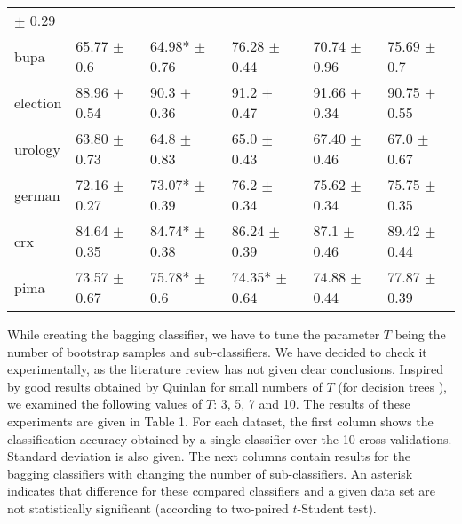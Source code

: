 \documentclass{llncs}
\begin{document}
\begin{table}
{\begin{tabular}{llllll}
\scriptsize{$\pm$ 0.29} \\ bupa & 65.77 \scriptsize{$\pm$ 0.6} & 64.98*
\scriptsize{$\pm$ 0.76} & 76.28 \scriptsize{$\pm$ 0.44} & 70.74
\scriptsize{$\pm$ 0.96} & 75.69 \scriptsize{$\pm$ 0.7} \\ election & 88.96
\scriptsize{$\pm$ 0.54} & 90.3 \scriptsize{$\pm$ 0.36} & 91.2
\scriptsize{$\pm$ 0.47} & 91.66 \scriptsize{$\pm$ 0.34} & 90.75
\scriptsize{$\pm$ 0.55} \\  urology & 63.80 \scriptsize{$\pm$ 0.73} & 64.8
\scriptsize{$\pm$ 0.83} & 65.0 \scriptsize{$\pm$ 0.43} & 67.40
\scriptsize{$\pm$ 0.46} & 67.0 \scriptsize{$\pm$ 0.67} \\ german & 72.16
\scriptsize{$\pm$ 0.27} & 73.07* \scriptsize{$\pm$ 0.39} & 76.2
\scriptsize{$\pm$ 0.34} & 75.62 \scriptsize{$\pm$ 0.34} & 75.75
\scriptsize{$\pm$ 0.35} \\ crx & 84.64 \scriptsize{$\pm$ 0.35} & 84.74*
\scriptsize{$\pm$ 0.38} & 86.24 \scriptsize{$\pm$ 0.39} & 87.1
\scriptsize{$\pm$ 0.46} & 89.42 \scriptsize{$\pm$ 0.44} \\ pima & 73.57
\scriptsize{$\pm$ 0.67} & 75.78* \scriptsize{$\pm$ 0.6} & 74.35*
\scriptsize{$\pm$ 0.64} & 74.88 \scriptsize{$\pm$ 0.44} & 77.87
\scriptsize{$\pm$ 0.39} \\
 \hline
\end{tabular}
}
\end{table}

While creating the bagging classifier, we have to tune the parameter $T$
being the number of bootstrap samples and sub-classifiers. We have decided
to check it experimentally, as the literature review has not given clear
conclusions. Inspired by good results obtained by Quinlan for small numbers
of $T$ (for decision trees \cite{Quin98}), we examined  the following values
of $T$: 3, 5, 7 and 10. The results of these experiments are given in Table
1. For each dataset, the first column shows the classification accuracy
obtained by a single classifier over the 10 cross-validations. Standard
deviation is also given. The next columns contain results for the bagging
classifiers with changing the number of sub-classifiers. An asterisk
indicates that difference for these compared classifiers and a given data
set are not statistically significant (according to two-paired $t$-Student
test).
\end{document}
